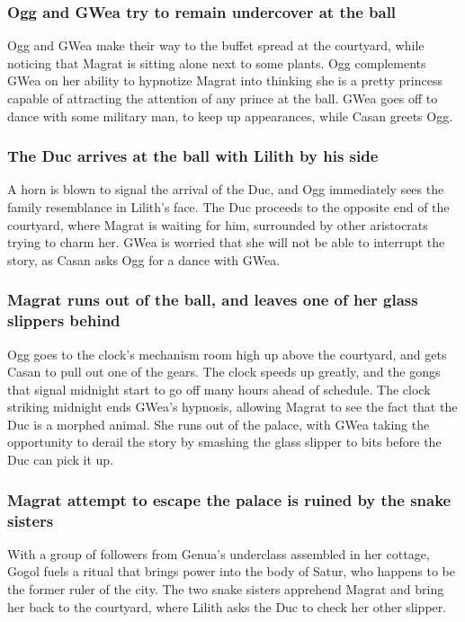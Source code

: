 \subsubsection{\Gls{Ogg} and \Gls{GWea} try to remain undercover at the ball}
\Gls{Ogg} and \Gls{GWea} make their way to the buffet spread at the courtyard, while noticing that
\Gls{Magrat} is sitting alone next to some plants. \Gls{Ogg} complements \Gls{GWea} on her ability
to hypnotize \Gls{Magrat} into thinking she is a pretty princess capable of attracting the attention
of any prince at the ball. \Gls{GWea} goes off to dance with some military man, to keep up
appearances, while \Gls{Casan} greets \Gls{Ogg}.

\subsubsection{The \Gls{Duc} arrives at the ball with \Gls{Lilith} by his side}
A horn is blown to signal the arrival of the \Gls{Duc}, and \Gls{Ogg} immediately sees the family
resemblance in \Gls{Lilith}'s face. The \Gls{Duc} proceeds to the opposite end of the courtyard,
where \Gls{Magrat} is waiting for him, surrounded by other aristocrats trying to charm her.
\Gls{GWea} is worried that she will not be able to interrupt the story, as \Gls{Casan} asks
\Gls{Ogg} for a dance with \Gls{GWea}.

\subsubsection{\Gls{Magrat} runs out of the ball, and leaves one of her glass slippers behind}
\Gls{Ogg} goes to the clock's mechanism room high up above the courtyard, and gets \Gls{Casan} to
pull out one of the gears. The clock speeds up greatly, and the gongs that signal midnight start
to go off many hours ahead of schedule. The clock striking midnight ends \Gls{GWea}'s hypnosis,
allowing \Gls{Magrat} to see the fact that the \Gls{Duc} is a morphed animal. She runs out of the
palace, with \Gls{GWea} taking the opportunity to derail the story by smashing the glass slipper to
bits before the \Gls{Duc} can pick it up.

\subsubsection{\Gls{Magrat} attempt to escape the palace is ruined by the snake sisters}
With a group of followers from Genua's underclass assembled in her cottage, \Gls{Gogol} fuels a
ritual that brings power into the body of \Gls{Satur}, who happens to be the former ruler of the
city. The two snake sisters apprehend \Gls{Magrat} and bring her back to the courtyard, where
\Gls{Lilith} asks the \Gls{Duc} to check her other slipper.

